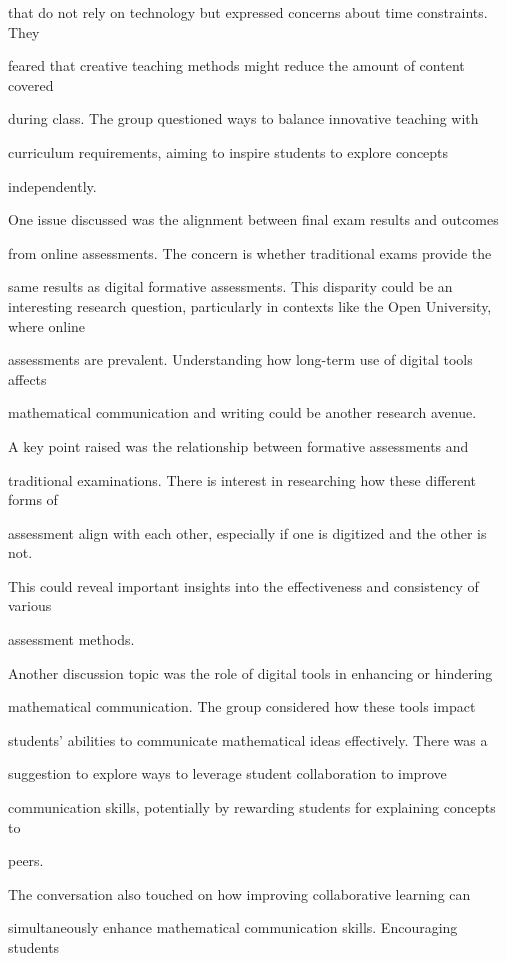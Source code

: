 \documentclass[11pt]{article}
\begin{document}
that do not rely on technology but expressed concerns about time constraints. They

feared that creative teaching methods might reduce the amount of content covered

during class. The group questioned ways to balance innovative teaching with

curriculum requirements, aiming to inspire students to explore concepts

independently.

One issue discussed was the alignment between final exam results and outcomes

from online assessments. The concern is whether traditional exams provide the

same results as digital formative assessments. This disparity could be an interesting research question, particularly in contexts like the Open University, where online

assessments are prevalent. Understanding how long-term use of digital tools affects

mathematical communication and writing could be another research avenue.

A key point raised was the relationship between formative assessments and

traditional examinations. There is interest in researching how these different forms of

assessment align with each other, especially if one is digitized and the other is not.

This could reveal important insights into the effectiveness and consistency of various

assessment methods.

Another discussion topic was the role of digital tools in enhancing or hindering

mathematical communication. The group considered how these tools impact

students' abilities to communicate mathematical ideas effectively. There was a

suggestion to explore ways to leverage student collaboration to improve

communication skills, potentially by rewarding students for explaining concepts to

peers.

The conversation also touched on how improving collaborative learning can

simultaneously enhance mathematical communication skills. Encouraging students
\end{document}
